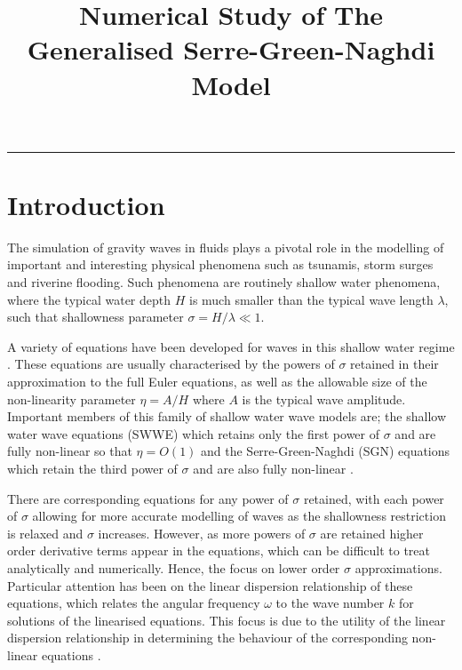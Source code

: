 \documentclass[10pt]{elsarticle}
\title{Numerical Study of The Generalised Serre-Green-Naghdi Model}
\begin{document}
\maketitle

\vspace{-0.3in}
\noindent
\rule{\linewidth}{0.4pt}

\tableofcontents

\section{Introduction}
The simulation of gravity waves in fluids plays a pivotal role in the modelling of important and interesting physical phenomena such as tsunamis, storm surges and riverine flooding. Such phenomena are routinely shallow water phenomena, where the typical water depth $H$ is much smaller than the typical wave length $\lambda$, such that shallowness parameter $\sigma = H/  \lambda \ll 1$. 

A variety of equations have been developed for waves in this shallow water regime \cite{Bonneton-Lannes-2009-16601,Madsen-Schaffer-1998}. These equations are usually characterised by the powers of $\sigma$ retained in their approximation to the full Euler equations, as well as the allowable size of the non-linearity parameter $\eta = A/H$ where $A$ is the typical wave amplitude. Important members of this family of shallow water wave models are; the shallow water wave equations (SWWE) which retains only the first power of $\sigma$ \cite{Bonneton-Lannes-2009-16601} and are fully non-linear so that $\eta  = O\left(1\right)$ and the Serre-Green-Naghdi (SGN) equations which retain the third power of $\sigma$ and are also fully non-linear \cite{Bonneton-Lannes-2009-16601}. 

There are corresponding equations for any power of $\sigma$ retained, with each power of $\sigma$ allowing for more accurate modelling of waves as the shallowness restriction is relaxed and $\sigma$ increases. However, as more powers of $\sigma$ are retained higher order derivative terms appear in the equations, which can be difficult to treat analytically and numerically. Hence, the focus on lower order $\sigma$ approximations. Particular attention has been on the linear dispersion relationship of these equations, which relates the angular frequency $\omega$ to the wave number $k$ for solutions of the linearised equations. This focus is due to the utility of the linear dispersion relationship in determining the behaviour of the corresponding non-linear equations \cite{Pitt-2018-61,Dougalis-etal-2007,Clamond-et.al-2017-245}. 
\end{document}
